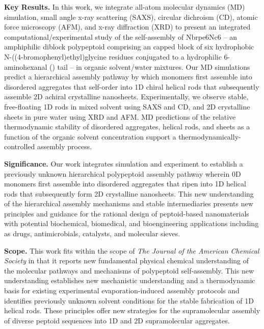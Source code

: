 \documentclass[11pt,a4paper]{letter} %
\begin{document}
\begin{letter}
\textbf{Key Results.}  In this work, we integrate all-atom molecular dynamics (MD) simulation, small angle x-ray scattering (SAXS), circular dichroism (CD), atomic force microscopy (AFM), and x-ray diffraction (XRD) to present an integrated computational/experimental study of the self-assembly of Nbrpe6Nc6 -- an amphiphilic diblock polypeptoid comprising an  capped block of six hydrophobic N-((4-bromophenyl)ethyl)glycine residues conjugated to a hydrophilic 6-aminohexanal () tail -- in organic solvent/water mixtures. Our MD simulations predict a hierarchical assembly pathway by which monomers first assemble into disordered aggregates that self-order into 1D chiral helical rods that subsequently assemble 2D achiral crystalline nanosheets. Experimentally, we observe stable, free-floating 1D rods in mixed solvent using SAXS and CD, and 2D crystalline sheets in pure water using XRD and AFM. MD predictions of the relative thermodynamic stability of disordered aggregates, helical rods, and sheets as a function of the organic solvent concentration support a thermodynamically-controlled assembly process. 

\textbf{Significance.} Our work integrates simulation and experiment to establish a previously unknown hierarchical polypeptoid assembly pathway wherein 0D monomers first assemble into disordered aggregates that ripen into 1D helical rods that subsequently form 2D crystalline nanosheets. This new understanding of the hierarchical assembly mechanisms and stable intermediaries presents new principles and guidance for the rational design of peptoid-based nanomaterials with potential biochemical, biomedical, and bioengineering applications including as drugs, antimicrobials, catalysts, and molecular sieves.

\textbf{Scope.}  This work fits within the scope of \textit{The Journal of the American Chemical Society} in that it reports new fundamental physical chemical understanding of the molecular pathways and mechanisms of polypeptoid self-assembly. This new understanding establishes new mechanistic understanding and a thermodynamic basis for existing experimental evaporation-induced assembly protocols and identifies previously unknown solvent conditions for the stable fabrication of 1D helical rods. These principles offer new strategies for the supramolecular assembly of diverse peptoid sequences into 1D and 2D supramolecular aggregates.  



\end{letter}
\end{document}
